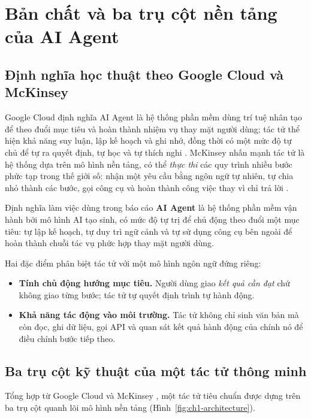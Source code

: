 \chapter{Bản chất và ba trụ cột nền tảng của AI Agent}

\section{Định nghĩa học thuật theo Google Cloud và McKinsey}
Google Cloud định nghĩa AI Agent là hệ thống phần mềm dùng trí tuệ nhân tạo để theo đuổi mục tiêu và hoàn thành nhiệm vụ
thay mặt người dùng; tác tử thể hiện khả năng suy luận, lập kế hoạch và ghi nhớ, đồng thời có một mức độ tự chủ để tự ra
quyết định, tự học và tự thích nghi \cite{google_agents}. McKinsey nhấn mạnh tác tử là hệ thống dựa trên mô hình nền
tảng, có thể \emph{thực thi} các quy trình nhiều bước phức tạp trong thế giới số: nhận một yêu cầu bằng ngôn ngữ tự
nhiên, tự chia nhỏ thành các bước, gọi công cụ và hoàn thành công việc thay vì chỉ trả lời \cite{mckinsey_agents}.

\begin{dinhnghia}{Định nghĩa làm việc dùng trong báo cáo}
\textbf{AI Agent} là hệ thống phần mềm vận hành bởi mô hình AI tạo sinh, có mức độ tự trị để chủ động theo đuổi một mục
tiêu: tự lập kế hoạch, tự duy trì ngữ cảnh và tự sử dụng công cụ bên ngoài để hoàn thành chuỗi tác vụ phức hợp thay mặt
người dùng.
\end{dinhnghia}

Hai đặc điểm phân biệt tác tử với một mô hình ngôn ngữ đứng riêng:
\begin{itemize}
  \item \textbf{Tính chủ động hướng mục tiêu.} Người dùng giao \emph{kết quả cần đạt} chứ không giao từng bước; tác tử tự
        quyết định trình tự hành động.
  \item \textbf{Khả năng tác động vào môi trường.} Tác tử không chỉ sinh văn bản mà còn đọc, ghi dữ liệu, gọi API và
        quan sát kết quả hành động của chính nó để điều chỉnh bước tiếp theo.
\end{itemize}

\section{Ba trụ cột kỹ thuật của một tác tử thông minh}
Tổng hợp từ Google Cloud và McKinsey \cite{google_agents,mckinsey_agents}, một tác tử tiêu chuẩn được dựng trên ba trụ
cột quanh lõi mô hình nền tảng (Hình~\ref{fig:ch1-architecture}).


